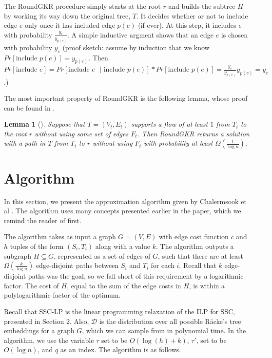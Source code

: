 \documentclass[12pt]{article}
\newtheorem{lemma}{Lemma}
\begin{document}
The RoundGKR procedure simply starts at the root $r$ and builds the subtree $H$ by working its way down the original tree, $T$. It decides whether or not to include edge $e$ only once it has included edge $p(e)$ (if ever). At this step, it includes $e$ with probability $\frac{y_e}{y_{p(e)}}$. A simple inductive argment shows that an edge $e$ is chosen with probability $y_e$ (proof sketch: assume by induction that we know $Pr[\text{include $p(e)$}] = y_{p(e)}$. Then $Pr[\text{include $e$}] = Pr[\text{include $e$ $|$ include $p(e)$}]*Pr[\text{include $p(e)$}] = \frac{y_e}{y_{p(e)}}y_{p(e)} = y_e$.)

The most important property of RoundGKR is the following lemma, whose proof can be found in \cite{GKR}.

\begin{lemma}[\cite{GKR}]
\label{lem:findpath}
Suppose that $T = (V_t, E_t)$ supports a flow of at least $1$ from $T_i$ to the root $r$ without using some set of edges $F_t$. Then RoundGKR returns a solution with a path in $T$ from $T_i$ to $r$ without using $F_t$ with probability at least $\Omega(\frac{1}{\log n})$. 
\end{lemma}
%

\section{Algorithm}

In this section, we present the approximation algorithm given by Chalermsook et al \cite{ssc}. The algorithm uses many concepts presented earlier in the paper, which we remind the reader of first.

The algorithm takes as input a graph $G = (V,E)$ with edge cost function $c$ and $h$ tuples of the form $(S_i,T_i)$ along with a value $k$. The algorithm outputs a subgraph $H \subseteq G$, represented as a set of edges of $G$, such that there are at least $\Omega(\frac{k}{\log n})$ edge-disjoint paths between $S_i$ and $T_i$ for each $i$. Recall that $k$ edge-disjoint paths was the goal, so we fall short of this requirement by a logarithmic factor. The cost of $H$, equal to the sum of the edge costs in $H$, is within a polylogarithmic factor of the optimum. 

Recall that SSC-LP is the linear programming relaxation of the ILP for SSC, presented in Section 2. Also, $\mathcal{D}$ is the distribution over all possible R\"{a}cke's tree embeddings for a graph $G$, which we can sample from in polynomial time. In the algorithm, we use the variable $\tau$ set to be $O(\log(h)+k)$, $\tau'$, set to be $O(\log n)$, and $q$ as an index. The algorithm is as follows.
\end{document}
